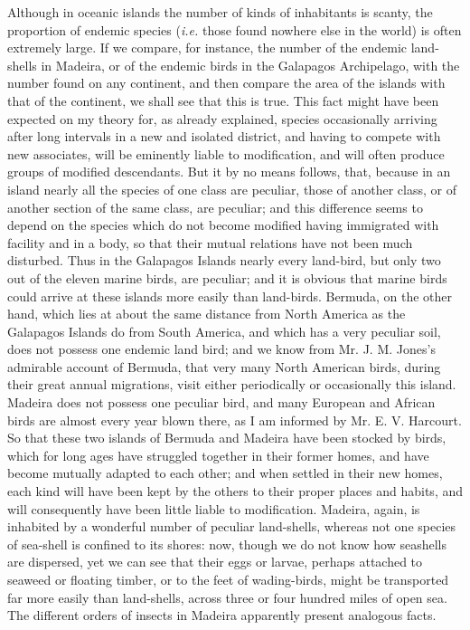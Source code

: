 \indent Although in oceanic islands the number of kinds of inhabitants is scanty, the proportion of endemic species (\emph{i.e.} those found nowhere else in the world) is often extremely large. If we compare, for instance, the number of the endemic land-shells in Madeira, or of the endemic birds in the Galapagos Archipelago, with the number found on any continent, and then compare the area of the islands with that of the continent, we shall see that this is true. This fact might have been expected on my theory for, as already explained, species occasionally arriving after long intervals in a new and isolated district, and having to compete with new associates, will be eminently liable to modification, and will often produce groups of modified descendants. But it by no means follows, that, because in an island nearly all the species of one class are peculiar, those of another class, or of another section of the same class, are peculiar; and this difference seems to depend on the species which do not become modified having immigrated with facility and in a body, so that their mutual relations have not been much disturbed. Thus in the Galapagos Islands nearly every land-bird, but only two out of the eleven marine birds, are peculiar; and it is obvious that marine birds could arrive at these islands more easily than land-birds. Bermuda, on the other hand, which lies at about the same distance from North America as the Galapagos Islands do from South America, and which has a very peculiar soil, does not possess one endemic land bird; and we know from Mr. J. M. Jones's admirable account of Bermuda, that very many North American birds, during their great annual migrations, visit either periodically or occasionally this island.  Madeira does not possess one peculiar bird, and many European and African birds are almost every year blown there, as I am informed by Mr. E. V. Harcourt. So that these two islands of Bermuda and Madeira have been stocked by birds, which for long ages have struggled together in their former homes, and have become mutually adapted to each other; and when settled in their new homes, each kind will have been kept by the others to their proper places and habits, and will consequently have been little liable to modification.  Madeira, again, is inhabited by a wonderful number of peculiar land-shells, whereas not one species of sea-shell is confined to its shores: now, though we do not know how seashells are dispersed, yet we can see that their eggs or larvae, perhaps attached to seaweed or floating timber, or to the feet of wading-birds, might be transported far more easily than land-shells, across three or four hundred miles of open sea. The different orders of insects in Madeira apparently present analogous facts.~\\
